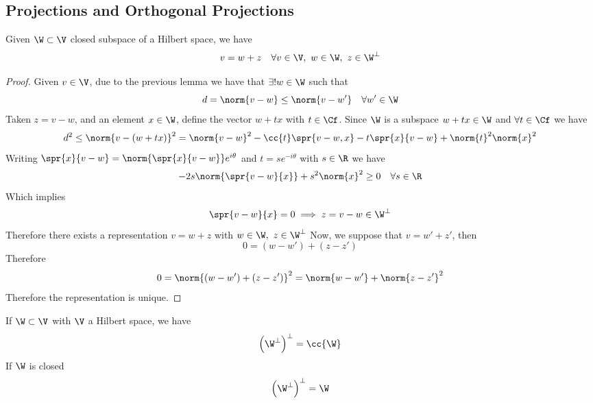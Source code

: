 \documentclass[../mmf.tex]{subfiles}
\begin{document}
\subsection{Projections and Orthogonal Projections}
\begin{thm}[Projection]
	Given $\W\subset\V$ closed subspace of a Hilbert space, we have
	\begin{equation*}
		v=w+z\quad\forall v\in\V,\ w\in\W,\ z\in\W^\perp
	\end{equation*}
\end{thm}
\begin{proof}
	Given $v\in\V$, due to the previous lemma we have that $\exists!w\in\W$ such that
	\begin{equation*}
		d=\norm{v-w}\le\norm{v-w'}\quad\forall w'\in\W
	\end{equation*}
	Taken $z=v-w$, and an element $x\in\W$, define the vector $w+tx$ with $t\in\Cf$. Since $\W$ is a subspace $w+tx\in\W$ and $\forall t\in\Cf$ we have
	\begin{equation*}
		d^2\le\norm{v-(w+tx)}^2=\norm{v-w}^2-\cc{t}\spr{v-w,x}-t\spr{x}{v-w}+\norm{t}^2\norm{x}^2
	\end{equation*}
	Writing $\spr{x}{v-w}=\norm{\spr{x}{v-w}}e^{i\theta}$ and $t=se^{-i\theta}$ with $s\in\R$ we have
	\begin{equation*}
		-2s\norm{\spr{v-w}{x}}+s^2\norm{x}^2\ge0\quad\forall s\in\R
	\end{equation*}
	Which implies
	\begin{equation*}
		\spr{v-w}{x}=0\implies{} z=v-w\in\W^\perp
	\end{equation*}
	Therefore there exists a representation $v=w+z$ with $w\in\W,\ z\in\W^\perp$
	Now, we suppose that $v=w'+z'$, then
	\begin{equation*}
		0=(w-w')+(z-z')
	\end{equation*}
	Therefore
	\begin{equation*}
		0=\norm{(w-w')+(z-z')}^2=\norm{w-w'}+\norm{z-z'}^2
	\end{equation*}
	Therefore the representation is unique.
\end{proof}
\begin{thm}
	If $\W\subset\V$ with $\V$ a Hilbert space, we have
	\begin{equation*}
		\left( \W^\perp \right)^\perp=\cc{\W}
	\end{equation*}
	If $\W$ is closed
	\begin{equation*}
		\left( \W^\perp \right)^\perp=\W
	\end{equation*}
\end{thm}
\end{document}
